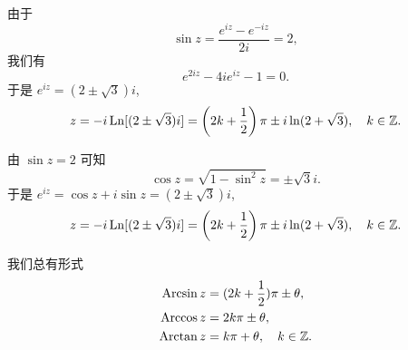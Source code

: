 \begin{solution}
  由于
  \[\sin z=\dfrac{e^{iz}-e^{-iz}}{2i}=2,\]
  我们有
  \[e^{2iz}-4ie^{iz}-1=0.\]
  于是 $e^{iz}=(2\pm\sqrt 3)i$,
  \[z=-i\operatorname{Ln}[(2\pm\sqrt 3)i]=\left(2k+\frac{1}{2}\right)\pi\pm i\ln(2+\sqrt3),\quad k\in{\mathbb{Z}}.\]
\end{solution}

\begin{solution}[另解]
	由 $\sin z=2$ 可知
	\[\cos z=\sqrt{1-\sin^2 z}=\pm\sqrt 3i.\]
	于是 $e^{iz}=\cos z+i\sin z=(2\pm\sqrt 3)i$,
		\[z=-i\operatorname{Ln}[(2\pm\sqrt 3)i]=\left(2k+\frac{1}{2}\right)\pi\pm i\ln(2+\sqrt3),\quad k\in{\mathbb{Z}}.\]
\end{solution}
我们总有形式
\begin{align*}
	\operatorname{Arcsin} z&=(2k+\frac{1}{2})\pi\pm \theta,\\
	\operatorname{Arccos} z&=2k\pi\pm \theta,\\
	\operatorname{Arctan} z&=k\pi+\theta,\quad k\in{\mathbb{Z}}.
\end{align*}


